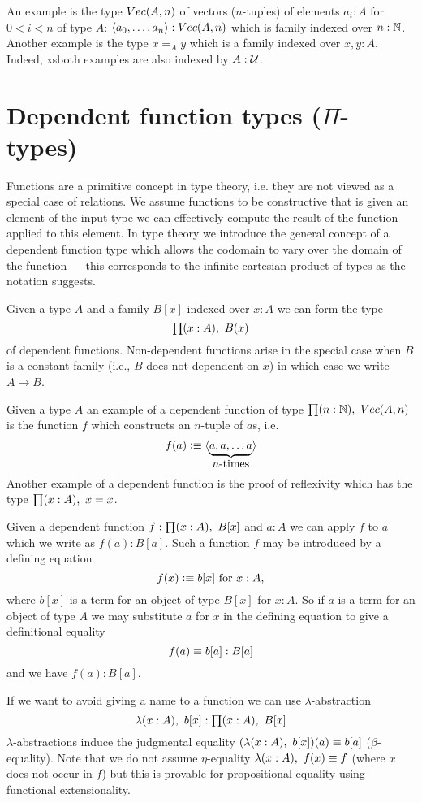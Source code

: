 An example is the type $Vec(A,n)$ of
vectors ($n$-tuples) of elements $a_i : A$ for $0 < i< n$ of type $A$:
$\langle a_0,\dots,a_n\rangle : Vec(A,n)$ which is family indexed
over $n : \mathbb{N}$. Another example is the type $x =_A y$ which is a
family indexed over $x,y : A$. Indeed, xsboth examples are also
indexed by $A:\mathcal{U}$.

\section{Dependent function types (\texorpdfstring{$\Pi$}{Π}-types)}
\label{sec:pi-types}

Functions are a primitive concept in type theory, i.e. they are not
viewed as a special case of relations. We assume functions to be
constructive that is given an element of the input type we can
effectively compute the result of the function applied to this
element. In type theory we introduce the general concept of a
dependent function type which allows the codomain to vary over the
domain of the function --- this corresponds to the infinite cartesian
product of types as the notation suggests. 

Given a type $A$
and a family $B[x]$ indexed over $x:A$ we can form the type
\[\prd{x:A}B(x)\] of dependent functions. Non-dependent functions arise
in the special case when $B$ is a constant family (i.e., $B$ does not
dependent on $x$) in which case we write $A \to B$.

Given a type $A$ an example of a dependent function of type
$\prd{n:\Nat}\Vect(A,n)$
is the function $f$ which constructs an $n$-tuple of $a$s, i.e. 
\[ f(a) \vcentcolon\equiv \langle \underbrace{a,a,\dots a}_{\mbox{$n$-times}}\rangle \] %
 Another example
of a dependent function is the proof of reflexivity which has the type
$\prd{x:A}x = x$.

Given a dependent function $f : \prd{x:A}B[x]$ and $a : A$ we can
apply $f$ to $a$ which we write as $f(a) : B[a]$.  Such a function $f$ may be introduced by a defining equation
  \[ f(x)\vcentcolon\equiv b[x]\mbox{ for } x:A,\]
where $b[x]$ is a term for an object of type $B[x]$ for $x:A$. So if $a$ is a term for an object of type $A$ we may substitute $a$ for $x$ in the defining equation to give a definitional equality
  \[ f(a)\equiv b[a]:B[a]\]
and we have $f(a):B[a]$. 

If we want to avoid giving a name to a function we can use
$\lambda$-abstraction 
\[\lam{x:A}b[x] : \prd{x:A}B[x]\]
$\lambda$-abstractions induce the judgmental equality
$(\lam{x:A}b[x])(a) \jdeq b[a]$ ($\beta$-equality). Note that
we do not assume $\eta$-equality $\lam{x:A} f(x) \jdeq f$ (where
$x$ does not occur in $f$) but this is provable for propositional
equality using functional extensionality.

